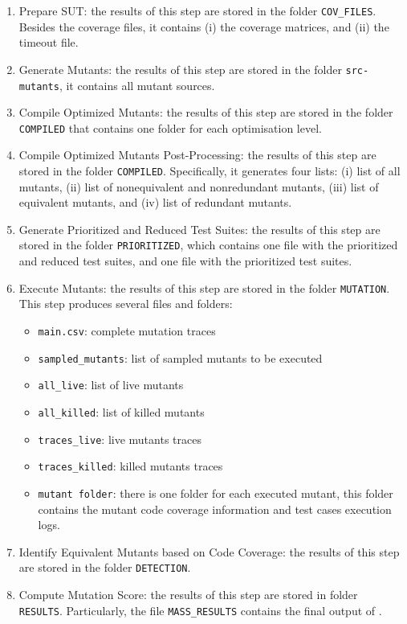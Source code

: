 \begin{enumerate}
	\item Prepare SUT: the results of this step are stored in the folder \texttt{COV\_FILES}. Besides the coverage files, it contains (i) the coverage matrices, and (ii) the timeout file.
	\item Generate Mutants: the results of this step are stored in the folder \texttt{src-mutants}, it contains all mutant sources.
	\item Compile Optimized Mutants: the results of this step are stored in the folder \texttt{COMPILED} that contains one folder for each optimisation level.
	\item Compile Optimized Mutants Post-Processing: the results of this step are stored in the folder \texttt{COMPILED}. Specifically, it generates four lists: (i) list of all mutants, (ii) list of nonequivalent and nonredundant mutants, (iii) list of equivalent mutants, and (iv) list of redundant mutants.
	\item Generate Prioritized and Reduced Test Suites: the results of this step are stored in the folder \texttt{PRIORITIZED}, which contains one file with the prioritized and reduced test suites, and one file with the prioritized test suites.
	\item Execute Mutants: the results of this step are stored in the folder \texttt{MUTATION}. This step produces several files and folders:
	\begin{itemize}
		\item \texttt{main.csv}: complete mutation traces
		\item \texttt{sampled\_mutants}: list of sampled mutants to be executed
		\item \texttt{all\_live}: list of live mutants
		\item \texttt{all\_killed}: list of killed mutants
		\item \texttt{traces\_live}: live mutants traces
		\item \texttt{traces\_killed}: killed mutants traces
		\item \texttt{mutant folder}: there is one folder for each executed mutant, this folder contains the mutant code coverage information and test cases execution logs.
	\end{itemize}
	\item Identify Equivalent Mutants based on Code Coverage: the results of this step are stored in the folder \texttt{DETECTION}.
	\item Compute Mutation Score: the results of this step are stored in folder \texttt{RESULTS}. Particularly, the file \texttt{MASS\_RESULTS} contains the final output of \MASS.
\end{enumerate}



